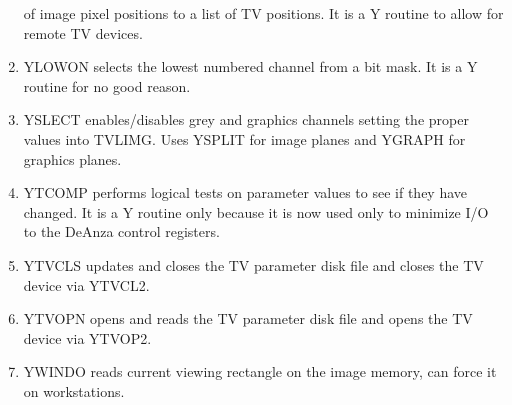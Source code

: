 \begin{enumerate}
of image pixel positions to a list of TV positions.  It is a Y routine
to allow for remote TV devices.
\item YLOWON selects the lowest numbered channel from a
bit mask.  It is a Y routine for no good reason.
\item YSLECT enables/disables grey and graphics channels
setting the proper values into TVLIMG.  Uses YSPLIT for image planes
and YGRAPH for graphics planes.
\item YTCOMP performs logical tests on parameter values
to see if they have changed.  It is a Y routine only because it is now
used only to minimize I/O to the DeAnza control registers.
\item YTVCLS updates and closes the TV parameter disk
file and closes the TV device via YTVCL2.
\item YTVOPN opens and reads the TV parameter disk file
and opens the TV device via YTVOP2.
\item YWINDO reads current viewing rectangle on the
image memory, can force it on workstations.


\end{enumerate} %
